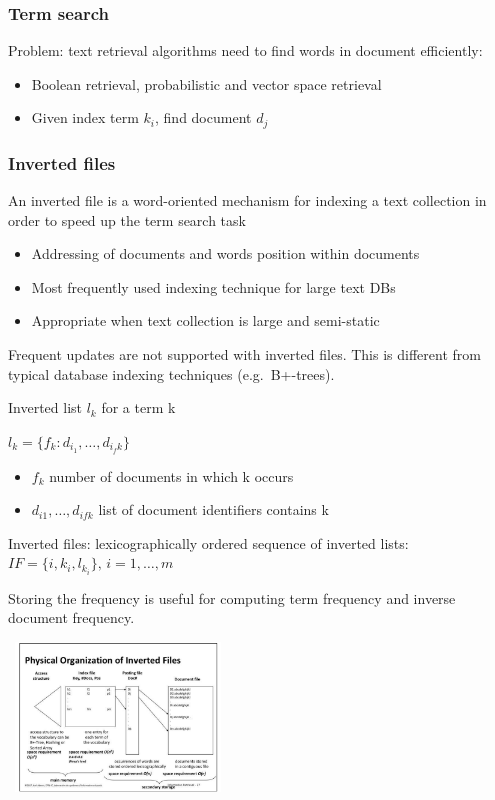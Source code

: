 \subsubsection{Term search}
Problem: text retrieval algorithms need to find words in document
efficiently:
\begin{itemize}
\item Boolean retrieval, probabilistic and vector space retrieval
\item Given index term $ k_i $, find document $ d_j $
\end{itemize}

\subsubsection{Inverted files}

An inverted file is a word-oriented mechanism for indexing a text
collection in order to speed up the term search task
\begin{itemize}
\item Addressing of documents and words position within documents
\item Most frequently used indexing technique for large text DBs
\item Appropriate when text collection is large and semi-static
\end{itemize}

Frequent updates are not supported with inverted files. This is different from
typical database indexing techniques (e.g.\ B+-trees).

Inverted list $ l_k $ for a term k

$ l_k = \{ f_k : d_{i_1}, \ldots, d_{i_fk} \} $
\begin{itemize}
\item $ f_k $ number of documents in which k occurs
\item $ d_{i1}, \ldots, d_{ifk} $ list of document identifiers
  contains k
\end{itemize}

Inverted files: lexicographically ordered sequence of inverted lists:
$ IF = \{ i, k_i, l_{k_i} \}, \, i = 1, \ldots, m $

Storing the frequency is useful for computing term frequency and
inverse document frequency.

\includegraphics[height=150px,width=220px]{IF.png}

